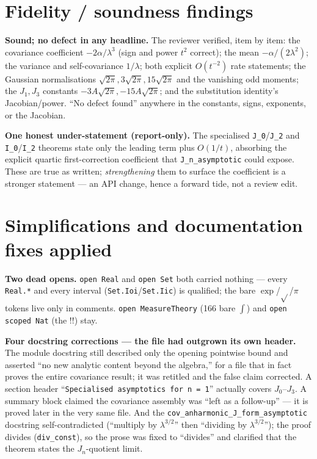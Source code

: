 \documentclass[11pt]{article}
\begin{document}
\section{Fidelity / soundness findings}
\textbf{Sound; no defect in any headline.} The reviewer verified, item by item: the covariance
coefficient $-2\alpha/\lambda^3$ (sign and power $t^2$ correct); the mean $-\alpha/(2\lambda^2)$; the
variance and self-covariance $1/\lambda$; both explicit $O(t^{-2})$ rate statements; the Gaussian
normalisations $\sqrt{2\pi},3\sqrt{2\pi},15\sqrt{2\pi}$ and the vanishing odd moments; the $J_1,J_3$
constants $-3A\sqrt{2\pi},-15A\sqrt{2\pi}$; and the substitution identity's Jacobian/power. ``No
defect found'' anywhere in the constants, signs, exponents, or the Jacobian.

\textbf{One honest under-statement (report-only).} The specialised \texttt{J\_0}/\texttt{J\_2} and
\texttt{I\_0}/\texttt{I\_2} theorems state only the leading term plus $O(1/t)$, absorbing the
explicit quartic first-correction coefficient that \texttt{J\_n\_asymptotic} could expose. These are
true as written; \emph{strengthening} them to surface the coefficient is a stronger statement --- an
API change, hence a forward tide, not a review edit.

\section{Simplifications and documentation fixes applied}
\textbf{Two dead opens.} \texttt{open Real} and \texttt{open Set} both carried nothing --- every
\texttt{Real.*} and every interval (\texttt{Set.Ioi}/\texttt{Set.Iic}) is qualified; the bare
$\exp$/$\sqrt{}$/$\pi$ tokens live only in comments. \texttt{open MeasureTheory} (166 bare $\int$) and
\texttt{open scoped Nat} (the $!!$) stay.

\textbf{Four docstring corrections --- the file had outgrown its own header.} The module docstring
still described only the opening pointwise bound and asserted ``no new analytic content beyond the
algebra,'' for a file that in fact proves the entire covariance result; it was retitled and the false
claim corrected. A section header ``\texttt{Specialised asymptotics for n = 1}'' actually covers
$J_0$--$J_3$. A summary block claimed the covariance assembly was ``left as a follow-up'' --- it is
proved later in the very same file. And the \texttt{cov\_anharmonic\_J\_form\_asymptotic} docstring
self-contradicted (``multiply by $\lambda^{3/2}$'' then ``dividing by $\lambda^{3/2}$''); the proof
divides (\texttt{div\_const}), so the prose was fixed to ``divides'' and clarified that the theorem
states the $J_n$-quotient limit.
\end{document}
